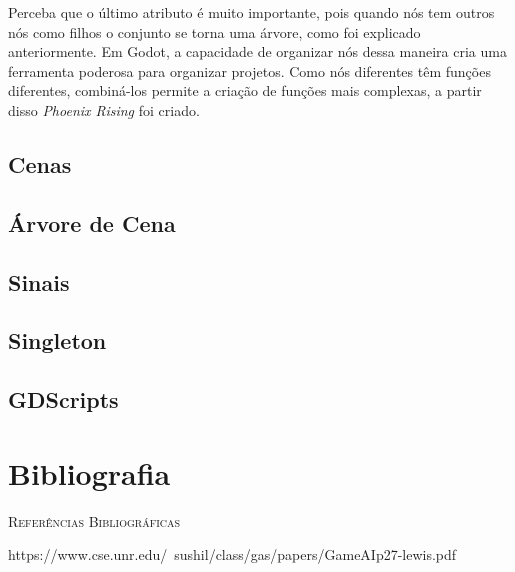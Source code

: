 Perceba que o último atributo é muito importante, pois quando nós tem outros nós
como filhos o conjunto se torna uma árvore, como foi explicado anteriormente.
Em Godot, a capacidade de organizar nós dessa maneira cria uma ferramenta 
poderosa para organizar projetos. Como nós diferentes têm funções diferentes, 
combiná-los permite a criação de funções mais complexas, a partir disso
\textit{Phoenix Rising} foi criado.

\subsection{Cenas}
\subsection{Árvore de Cena}
\subsection{Sinais}
\subsection{Singleton}
\subsection{GDScripts}

\section{Bibliografia}

\textsc{Referências Bibliográficas} 

https://www.cse.unr.edu/~sushil/class/gas/papers/GameAIp27-lewis.pdf
